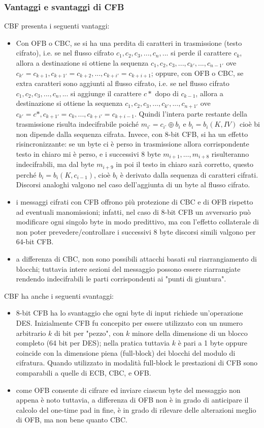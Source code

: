 \subsubsection{Vantaggi e svantaggi  di CFB}
CBF presenta i seguenti vantaggi:
\begin{itemize}
\item Con OFB o CBC, se si ha una perdita di caratteri in trasmissione (testo cifrato), i.e. se nel flusso cifrato $c_{1}, c_{2}, c_{3}, ... , c_{n}, ...$ si perde il carattere $c_{k}$, allora a destinazione si ottiene la sequenza $c_{1}, c_{2}, c_{3}, ... , c_{k'}, ... , c_{n-1'}$ ove $c_{k'} = c_{k+1}, c_{k+1'} = c_{k+2}, ... , c_{k+i'} = c_{k+i+1}$; oppure, con OFB o CBC, se extra caratteri sono aggiunti al flusso cifrato, i.e. se nel flusso cifrato$c_{1}, c_{2}, c_{3}, ... , c_{n}, ...$ si aggiunge il carattere $c*$ dopo di $c_{k-1}$, allora a destinazione si ottiene la sequenza $c_{1}, c_{2}, c_{3}, ... , c_{k'}, ... , c_{n+1'}$ ove $c_{k'} = c*, c_{k+1'} = c_{k}, ... , c_{k+i'} = c_{k+i-1}$. Quindi l'intera parte restante della trasmissione risulta indecifrabile poiché $m_{i’} = c_{i’} \oplus b_{i}$ e $b_{i} = b_{i}(K, IV)$ cioè bi non dipende dalla sequenza cifrata. Invece, con 8-bit CFB, si ha un effetto risincronizzante: se un byte ci è perso in trasmissione allora corrispondente testo in chiaro mi è perso, e i successivi 8 byte $m_{i+1}, …, m_{i+8}$ risulteranno indecifrabili, ma dal byte $m_{i+9}$ in poi il testo in chiaro sarà corretto, questo perché $b_{i} = b_{i}(K, c_{i-1})$, cioè $b_{i}$ è derivato dalla sequenza di caratteri cifrati. Discorsi analoghi valgono nel caso dell'aggiunta di un byte al flusso cifrato.
\item i messaggi cifrati con CFB offrono più protezione di CBC e di OFB rispetto ad eventuali manomissioni; infatti, nel caso di 8-bit CFB un avversario può modificare ogni singolo byte in modo predittivo, ma con l'effetto collaterale di non poter prevedere/controllare i successivi 8 byte discorsi simili valgono per 64-bit CFB.
\item a differenza di CBC, non sono possibili attacchi basati sul riarrangiamento di blocchi; tuttavia intere sezioni del messaggio possono essere riarrangiate rendendo indecifrabili le parti corrispondenti ai "punti di giuntura".
\end{itemize}
CBF ha anche i seguenti svantaggi:
\begin{itemize}
\item 8-bit CFB ha lo svantaggio che ogni byte di input richiede un'operazione DES. Inizialmente CFB fu concepito per essere utilizzato con un numero arbitrario $k$ di bit per "pezzo", con $k$ minore della dimensione di un blocco completo (64 bit per DES); nella pratica tuttavia $k$ è pari a 1 byte oppure coincide con la dimensione piena (full-block) dei blocchi del modulo di cifratura. Quando utilizzato in modalità full-block le prestazioni di CFB sono comparabili a quelle di ECB, CBC, e OFB.
\item come OFB consente di cifrare ed inviare ciascun byte del messaggio non appena è noto tuttavia, a differenza di OFB non è in grado di anticipare il calcolo del one-time pad in fine, è in grado di rilevare delle alterazioni meglio di OFB, ma non bene quanto CBC.
\end{itemize}
